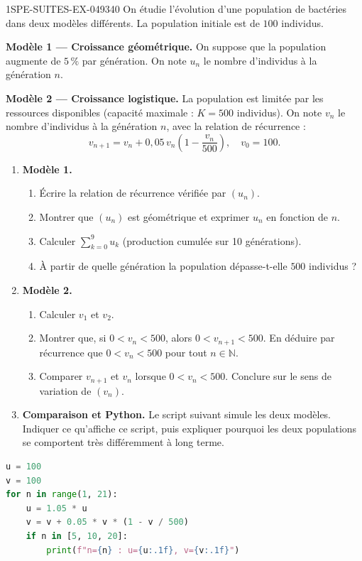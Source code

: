 \begin{exercice}{1SPE-SUITES-EX-049}{3}{40}
On étudie l'évolution d'une population de bactéries dans deux modèles différents. La population initiale est de $100$ individus.

\textbf{Modèle 1 — Croissance géométrique.}
On suppose que la population augmente de $5\,\%$ par génération. On note $u_n$ le nombre d'individus à la génération $n$.

\textbf{Modèle 2 — Croissance logistique.}
La population est limitée par les ressources disponibles (capacité maximale : $K = 500$ individus). On note $v_n$ le nombre d'individus à la génération $n$, avec la relation de récurrence :
\[
  v_{n+1} = v_n + 0{,}05\, v_n \left(1 - \frac{v_n}{500}\right), \quad v_0 = 100.
\]

\begin{enumerate}
  \item \textbf{Modèle 1.}
  \begin{enumerate}
    \item Écrire la relation de récurrence vérifiée par $(u_n)$.
    \item Montrer que $(u_n)$ est géométrique et exprimer $u_n$ en fonction de $n$.
    \item Calculer $\displaystyle\sum_{k=0}^{9} u_k$ (production cumulée sur 10 générations).
    \item À partir de quelle génération la population dépasse-t-elle $500$ individus ?
  \end{enumerate}

  \item \textbf{Modèle 2.}
  \begin{enumerate}
    \item Calculer $v_1$ et $v_2$.
    \item Montrer que, si $0 < v_n < 500$, alors $0 < v_{n+1} < 500$. En déduire par récurrence que $0 < v_n < 500$ pour tout $n \in \mathbb{N}$.
    \item Comparer $v_{n+1}$ et $v_n$ lorsque $0 < v_n < 500$. Conclure sur le sens de variation de $(v_n)$.
  \end{enumerate}

  \item \textbf{Comparaison et Python.} Le script suivant simule les deux modèles. Indiquer ce qu'affiche ce script, puis expliquer pourquoi les deux populations se comportent très différemment à long terme.
\end{enumerate}
\end{exercice}

\begin{lstlisting}[language=Python]
u = 100
v = 100
for n in range(1, 21):
    u = 1.05 * u
    v = v + 0.05 * v * (1 - v / 500)
    if n in [5, 10, 20]:
        print(f"n={n} : u={u:.1f}, v={v:.1f}")
\end{lstlisting}

